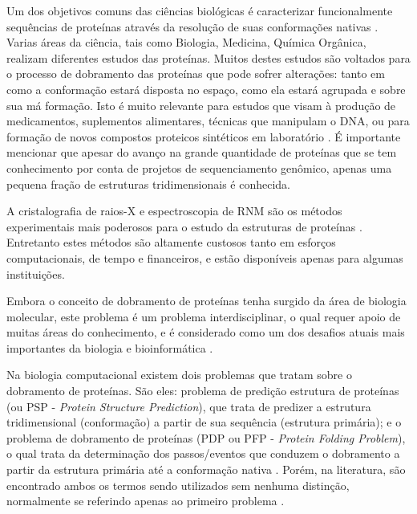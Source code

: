 Um dos objetivos comuns das ciências biológicas é caracterizar funcionalmente sequências de proteínas através da resolução de suas conformações nativas \cite{eswar2003tools}. Varias áreas da ciência, tais como Biologia, Medicina, Química Orgânica, realizam diferentes estudos das proteínas. Muitos destes estudos são voltados para o processo de dobramento das proteínas que pode sofrer alterações: tanto em como a conformação estará disposta no espaço, como ela estará agrupada e sobre sua má formação. Isto é muito relevante para estudos que visam à produção de medicamentos, suplementos alimentares, técnicas que manipulam o DNA, ou para formação de novos compostos proteicos sintéticos em laboratório \cite{devlin1998manual}. É importante mencionar que apesar do avanço na grande quantidade de proteínas que se tem conhecimento por conta de projetos de sequenciamento genômico, apenas uma pequena fração de estruturas tridimensionais é conhecida.

A cristalografia de raios-X e espectroscopia de RNM são os métodos experimentais mais poderosos para o estudo da estruturas de proteínas \cite{ilari2008protein} \cite{gobl2012application}. Entretanto estes métodos são altamente custosos tanto em esforços computacionais, de tempo e financeiros, e estão disponíveis apenas para algumas instituições.


Embora o conceito de dobramento de proteínas tenha surgido da área de biologia molecular, este problema é um problema interdisciplinar, o qual requer apoio de muitas áreas do conhecimento, e é considerado como um dos desafios atuais mais importantes da biologia e bioinformática \cite{nicosia2008generalized}. 

Na biologia computacional existem dois problemas que tratam sobre o dobramento de proteínas. São eles: problema de predição estrutura de proteínas (ou PSP - \textit{Protein Structure Prediction}), que trata de predizer a estrutura tridimensional (conformação) a partir de sua sequência (estrutura primária); e o problema de dobramento de proteínas (PDP ou PFP - \textit{Protein Folding Problem}), o qual trata da determinação dos passos/eventos que conduzem o dobramento a partir da estrutura primária até a conformação nativa \cite{lopes2008evolutionary}. Porém, na literatura, são encontrado ambos os termos sendo utilizados sem nenhuma distinção, normalmente se referindo apenas ao primeiro problema \cite{lopes2008evolutionary}.  

